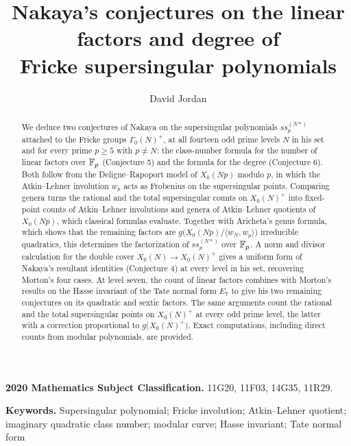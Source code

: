 \documentclass[11pt,a4paper]{article}
\title{Nakaya's conjectures on the linear factors and degree of\\Fricke supersingular polynomials}
\author{David Jordan}
\date{}
\theoremstyle{remark}\newtheorem{remark}[theorem]{Remark}
\numberwithin{equation}{section}
\begin{document}
	\maketitle
	\begin{abstract}
		We deduce two conjectures of Nakaya on the supersingular polynomials $ss_p^{(N*)}$ attached to the Fricke groups $\Gamma_0(N)^+$, at all fourteen odd prime levels $N$ in his set and for every prime $p\geq5$ with $p\neq N$: the class-number formula for the number of linear factors over $\mathbb F_p$ (Conjecture 5) and the formula for the degree (Conjecture 6). Both follow from the Deligne--Rapoport model of $X_0(Np)$ modulo $p$, in which the Atkin--Lehner involution $w_p$ acts as Frobenius on the supersingular points. Comparing genera turns the rational and the total supersingular counts on $X_0(N)^+$ into fixed-point counts of Atkin--Lehner involutions and genera of Atkin--Lehner quotients of $X_0(Np)$, which classical formulas evaluate. Together with Aricheta's genus formula, which shows that the remaining factors are $g\bigl(X_0(Np)/\langle w_N,w_p\rangle\bigr)$ irreducible quadratics, this determines the factorization of $ss_p^{(N*)}$ over $\mathbb F_p$. A norm and divisor calculation for the double cover $X_0(N)\to X_0(N)^+$ gives a uniform form of Nakaya's resultant identities (Conjecture 4) at every level in his set, recovering Morton's four cases. At level seven, the count of linear factors combines with Morton's results on the Hasse invariant of the Tate normal form $E_7$ to give his two remaining conjectures on its quadratic and sextic factors. The same arguments count the rational and the total supersingular points on $X_0(N)^+$ at every odd prime level, the latter with a correction proportional to $g\bigl(X_0(N)^+\bigr)$. Exact computations, including direct counts from modular polynomials, are provided.
	\end{abstract}
	\noindent\textbf{2020 Mathematics Subject Classification.} 11G20, 11F03, 14G35, 11R29.
	
	\noindent\textbf{Keywords.} Supersingular polynomial; Fricke involution; Atkin--Lehner quotient; imaginary quadratic class number; modular curve; Hasse invariant; Tate normal form
	
\end{document}
